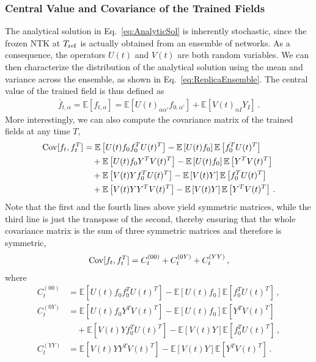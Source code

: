 \subsubsection{Central Value and Covariance of the Trained Fields}
\label{sec:CentralAndCovariance}

The analytical solution in Eq.~\eqref{eq:AnalyticSol} is inherently stochastic,
since the frozen NTK at $T_{\rm ref}$ is actually obtained from an ensemble of
networks. As a consequence, the operators $U(t)$ and $V(t)$ are both random
variables. We can then characterize the distribution of the analytical solution
using the mean and variance across the ensemble, as shown in
Eq.~\eqref{eq:ReplicaEnsemble}. The central value of the trained field is thus
defined as
\begin{align}
    \label{eq:MeanValAtT}
    \bar{f}_{t,\alpha} = \mathbb{E}\left[f_{t,\alpha}\right]
        = \mathbb{E}\left[U(t)_{\alpha\alpha'} f_{0,\alpha'}\right]
            + \mathbb{E}\left[V(t)_{\alpha I} Y_I\right] \, .
\end{align}
More interestingly, we can also compute the covariance matrix of the trained
fields at any time $T$,
\begin{align}
    \mathrm{Cov}[f_t,f_t^T]
        &= \mathbb{E}\left[U(t) f_0 f_0^T U(t)^T\right] 
            - \mathbb{E}\left[U(t) f_0\right] \mathbb{E}\left[f_0^T U(t)^T\right]  \nonumber \\
        &\quad + \mathbb{E}\left[U(t) f_0 Y^T V(t)^T\right] 
            - \mathbb{E}\left[U(t) f_0\right] \mathbb{E}\left[Y^T V(t)^T\right] \nonumber \\
        &\quad + \mathbb{E}\left[V(t) Y f_0^T U(t)^T\right]
            - \mathbb{E}\left[V(t) Y\right] \mathbb{E}\left[f_0^T U(t)^T\right] \nonumber \\
    \label{eq:CovAtT}
        &\quad + \mathbb{E}\left[V(t) Y Y^T V(t)^T\right]
            - \mathbb{E}\left[V(t) Y\right] \mathbb{E}\left[Y^T V(t)^T\right] \, .
\end{align}
Note that the first and the fourth lines above yield symmetric matrices, while
the third line is just the transpose of the second, thereby ensuring that the
whole covariance matrix is the sum of three symmetric matrices and therefore is
symmetric, 
\begin{align}
    \label{eq:SumOfCovariances}
    \mathrm{Cov}[f_t,f_t^T] = C_t^{(00)} + C_t^{(0Y)} + C_t^{(YY)}\, ,
\end{align}
where
\begin{align}
    \label{eq:C00term}
    C_t^{(00)} 
        &= \mathbb{E}\left[U(t) f_0 f_0^T U(t)^T\right] 
        - \mathbb{E}\left[U(t) f_0\right] \mathbb{E}\left[f_0^T U(t)^T\right]\, ,\\
    C_t^{(0Y)}
        &= \mathbb{E}\left[U(t) f_0 Y^T V(t)^T\right] 
        - \mathbb{E}\left[U(t) f_0\right] \mathbb{E}\left[Y^T V(t)^T\right] \nonumber \\
        \label{eq:C0Yterm}
        &\quad + \mathbb{E}\left[V(t) Y f_0^T U(t)^T\right]
            - \mathbb{E}\left[V(t) Y\right] \mathbb{E}\left[f_0^T U(t)^T\right] \, ,\\
    C_t^{(YY)}
        &= \mathbb{E}\left[V(t) Y Y^T V(t)^T\right]
        - \mathbb{E}\left[V(t) Y\right] \mathbb{E}\left[Y^T V(t)^T\right]\, .
\end{align}
